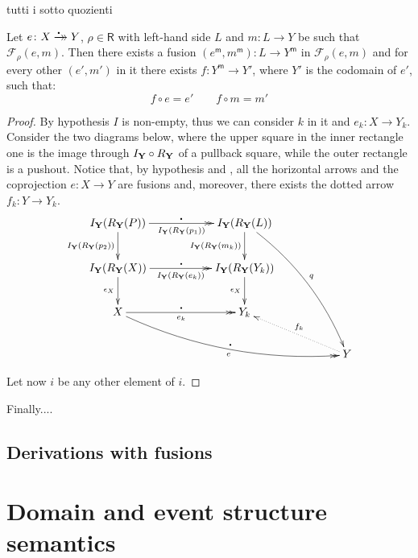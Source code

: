 \documentclass[a4paper,UKenglish,cleveref,pdftex,thm-restate,numberwithinsect]{lipics-v2021}
\newcommand{\xrightarrowdbl}[2][]{%
	\xrightarrow[#1]{#2}\mathrel{\mkern-14mu}\rightarrow
}
\newcommand{\mini}[0]{\scalebox{.4}{$\bullet$}}
\newcommand{\fto}[0]{\xrightarrowdbl{\mini}}
\newcommand{\mf}[1]{{#1}^\mathsf{m}}
\def\R{\mathsf{R}}
\def\Y{\textbf {\textup{Y}}}
\begin{document}
\begin{example}
	tutti i sotto quozienti
\end{example}


\begin{lemma}
	Let $e\colon X\fto Y$, $\rho\in \R$ with left-hand side $L$ and $m\colon L\to Y$ be such that $\mathcal{F}_\rho(e, m)$.  Then there exists a fusion $(\mf{e},\mf{m})\colon L\to \mf{Y}$  in $\mathcal{F}_\rho(e, m)$ and for every other $(e', m')$ in it there exists $f\colon \mf{Y}\to Y'$, where $Y'$ is the codomain of $e'$, such that:
\[f\circ e =e' \qquad f\circ m=m'\]
\end{lemma}

\begin{proof}By hypothesis $I$ is non-empty, thus we can consider $k$ in it and $e_k\colon X\to Y_k$.  Consider the two diagrams below, where the upper square  in the inner rectangle one is the image through $I_\Y\circ R_\Y$ of a pullback square, while the outer rectangle is a pushout. Notice that, by hypothesis and , all the horizontal arrows and the coprojection $e\colon X\to Y$ are fusions and, moreover, there exists the dotted arrow $f_k\colon Y\to Y_k$.
	\[\xymatrix@C=55pt{I_\Y(R_\Y(P)) \ar[d]_{I_\Y(R_\Y(p_2)) } \ar@{>>}[r]_-{I_\Y(R_\Y(p_1))}^{\mini} & I_\Y(R_\Y(L)) \ar@/^.4cm/[dddr]^{q} \ar[d]_{I_\Y(R_\Y(m_k)) } \\ I_\Y(R_\Y(X)) \ar[d]_{\epsilon_X} \ar@{>>}[r]_-{I_\Y(R_\Y(e_k))}^{\mini}& I_\Y(R_\Y(Y_k)) \ar[d]_{\epsilon_X}  \\ X\ar@{>>}@/_.5cm/[drr]^{\mini}_{e} \ar@{>>}[r]_{e_k}^{\mini}& Y_k \\ &&Y\ar@{.>}[ul]_{f_k}}\]

	Let now $i$ be any other element of $i$.
	
	
\end{proof}
 
 
 \begin{corollary}
 \end{corollary}
 
 

Finally....


\subsection{Derivations with fusions}

\section{Domain and event structure semantics}
\end{document}
